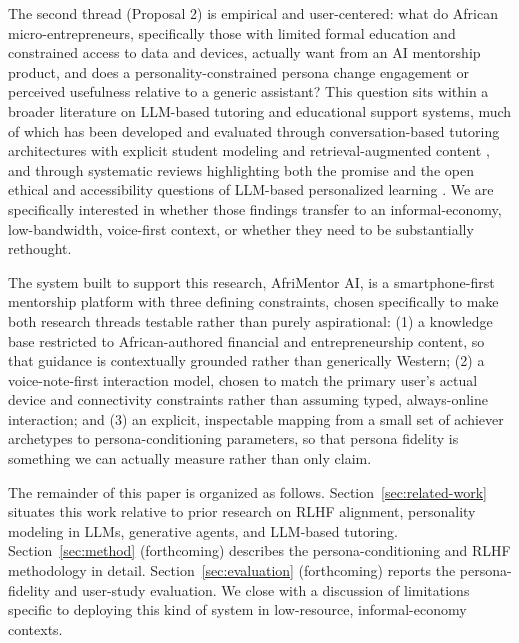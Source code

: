 The second thread (Proposal 2) is empirical and user-centered: what do African micro-entrepreneurs, specifically those with limited formal education and constrained access to data and devices, actually want from an AI mentorship product, and does a personality-constrained persona change engagement or perceived usefulness relative to a generic assistant? This question sits within a broader literature on LLM-based tutoring and educational support systems, much of which has been developed and evaluated through conversation-based tutoring architectures with explicit student modeling and retrieval-augmented content \citep{park2024tutoring,liu2025lpitutor}, and through systematic reviews highlighting both the promise and the open ethical and accessibility questions of LLM-based personalized learning \citep{sharma2025review}. We are specifically interested in whether those findings transfer to an informal-economy, low-bandwidth, voice-first context, or whether they need to be substantially rethought.

The system built to support this research, AfriMentor AI, is a smartphone-first mentorship platform with three defining constraints, chosen specifically to make both research threads testable rather than purely aspirational: (1) a knowledge base restricted to African-authored financial and entrepreneurship content, so that guidance is contextually grounded rather than generically Western; (2) a voice-note-first interaction model, chosen to match the primary user's actual device and connectivity constraints rather than assuming typed, always-online interaction; and (3) an explicit, inspectable mapping from a small set of achiever archetypes to persona-conditioning parameters, so that persona fidelity is something we can actually measure rather than only claim.

The remainder of this paper is organized as follows. Section~\ref{sec:related-work} situates this work relative to prior research on RLHF alignment, personality modeling in LLMs, generative agents, and LLM-based tutoring. Section~\ref{sec:method} (forthcoming) describes the persona-conditioning and RLHF methodology in detail. Section~\ref{sec:evaluation} (forthcoming) reports the persona-fidelity and user-study evaluation. We close with a discussion of limitations specific to deploying this kind of system in low-resource, informal-economy contexts.
